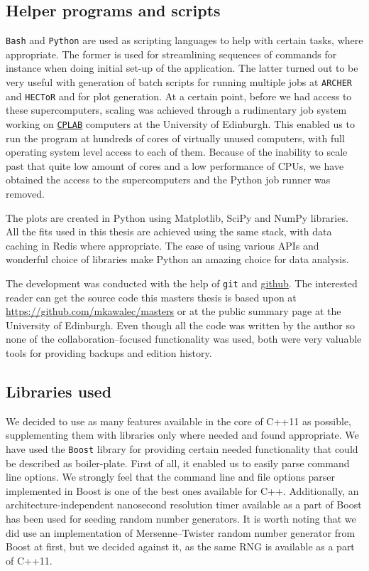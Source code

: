 \documentclass[11pt,a4paper]{article}
\begin{document}
\begin{appendices}
    \subsection{Helper programs and scripts}
    \texttt{Bash} and \texttt{Python} are used as scripting languages to help with certain tasks, where appropriate.
    The former is used for streamlining sequences of commands for instance when doing initial set-up of the application.
    The latter turned out to be very useful with generation of batch scripts for running multiple jobs at \texttt{ARCHER} and \texttt{HECToR} and for plot generation.
    At a certain point, before we had access to these supercomputers, scaling was achieved through a rudimentary job system working on \texttt{\href{http://www2.ph.ed.ac.uk/~wjh/faq/}{CPLAB}} computers at the University of Edinburgh.
    This enabled us to run the program at hundreds of cores of virtually unused computers, with full operating system level access to each of them.
    Because of the inability to scale past that quite low amount of cores and a low performance of CPUs, we have obtained the access to the supercomputers and the Python job runner was removed.

    The plots are created in Python using Matplotlib, SciPy and NumPy libraries.
    All the fits used in this thesis are achieved using the same stack, with data caching in Redis where appropriate.
    The ease of using various APIs and wonderful choice of libraries make Python an amazing choice for data analysis.

    The development was conducted with the help of \texttt{git} and \href{https://github.com/mkawalec/masters}{github}.
    The interested reader can get the source code this masters thesis is based upon at \url{https://github.com/mkawalec/masters} or at the public summary page at the University of Edinburgh.
    Even though all the code was written by the author so none of the collaboration--focused functionality was used, both were very valuable tools for providing backups and edition history.

    \subsection{Libraries used}
    We decided to use as many features available in the core of C++11 as possible, supplementing them with libraries only where needed and found appropriate.
    We have used the \texttt{Boost}\cite{gurtovoy02} library for providing certain needed functionality that could be described as boiler-plate.
    First of all, it enabled us to easily parse command line options.
    We strongly feel that the command line and file options parser implemented in Boost is one of the best ones available for C++.
    Additionally, an architecture-independent nanosecond resolution timer available as a part of Boost has been used for seeding random number generators.
    It is worth noting that we did use an implementation of Mersenne--Twister\cite{Matsumoto98} random number generator from Boost at first, but we decided against it, as the same RNG is available as a part of C++11.


\end{appendices}
\end{document}
